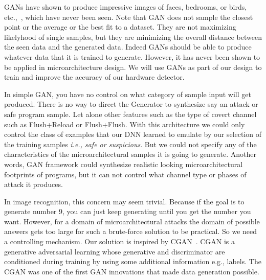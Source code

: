 GANs have shown to produce impressive images of faces, bedrooms, or birds, etc.,~\cite{}, which have never been seen. Note that GAN does not sample the closest point or the average or the best fit to a dataset. They are not maximizing likelyhood of single samples, but they are minimizing the overall distance between the seen data and the generated data.  Indeed GANs should be able to produce whatever data that it is trained to generate. However, it has never been shown to be applied in microarchitecture design. We will use GANs as part of our design to train and improve the accuracy of our hardware detector.  


 In simple GAN, you have no control on what category of sample input will get produced. There is no way to direct the Generator to synthesize say an attack or safe program sample. Let alone other features such as the type of covert channel such as Flush+Reload or Flush+Flush.
With this architecture we could only control the class of examples that our DNN learned to emulate by our selection of the training samples {\em i.e., safe or suspicious}. But we could not specify any of the characteristics of the microarchitectural samples it is going to generate. Another words, GAN framework could synthesize realistic looking microarchitectural footprints of programs, but it can not control what channel type or phases of attack it produces.

 
 In image recognition, this concern may seem trivial. Because if the goal is to generate number 9, you can just keep generating until you get the number you want. However, for a domain of microarchitectural attacks the domain of possible answers gets too large for such a brute-force solution to be practical. So we need a controlling mechanism.
Our solution is inspired by CGAN~\cite{cgan}. CGAN is a generative adversarial learning whose generative and discriminator are conditioned during training by using some additional information e.g., labels. The CGAN was one of the first GAN innovations that made data generation possible.  
 
